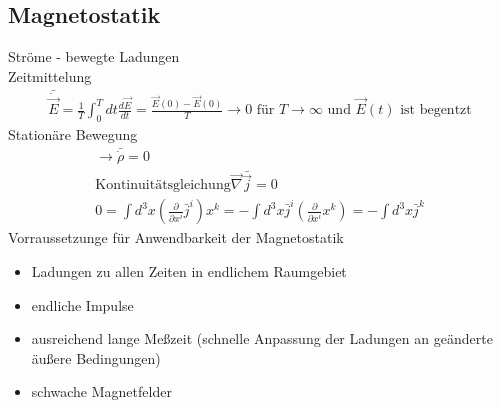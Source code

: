 \documentclass[a4paper]{article}
\begin{document}
\subsection{Magnetostatik}
Ströme - bewegte Ladungen\\
Zeitmittelung
\begin{align}
\bar{\dot{\vec{E}}}=\frac{1}{T}\int_0^T dt
\frac{d\vec{E}}{dt}=\frac{\vec{E}(0)-\vec{E}(0)}{T}\rightarrow 0 \text{ für }
T\rightarrow \infty \text{ und } \vec{E}(t) \text{ ist begentzt}
\end{align}
Stationäre Bewegung
\begin{align}
\rightarrow \bar{\dot{\rho}}=0\\
\text{Kontinuitätsgleichung} \vec{\nabla}\bar{{\vec{j}}}=0\\
0=\int d^3x\left( \frac{\partial}{\partial x^i}\bar{j}^i \right)x^k=
-\int d^3x \bar{j}^i \left( \frac{\partial}{\partial x^i}x^k \right)=-\int d^3x
\bar{j}^k
\end{align}
Vorraussetzunge für Anwendbarkeit der Magnetostatik
\begin{itemize}
  \item Ladungen zu allen Zeiten in endlichem Raumgebiet
  \item endliche Impulse
  \item ausreichend lange Meßzeit (schnelle Anpassung der Ladungen an geänderte
  äußere Bedingungen)
  \item schwache Magnetfelder
\end{itemize}
\end{document}
